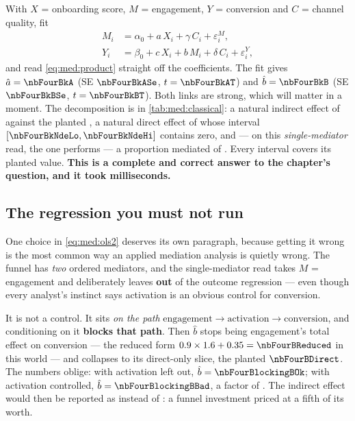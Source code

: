 With $X$ = onboarding score, $M$ = engagement, $Y$ = conversion and $C$ = channel quality, fit
%
\begin{align}
  M_i &= \alpha_0 + a\,X_i + \gamma\,C_i + \varepsilon^M_i, \label{eq:med:ols1}\\
  Y_i &= \beta_0 + c\,X_i + b\,M_i + \delta\,C_i + \varepsilon^Y_i, \label{eq:med:ols2}
\end{align}
%
and read \cref{eq:med:product} straight off the coefficients. The fit gives
$\hat a = \nbFourBkA$ (SE $\nbFourBkASe$, $t = \nbFourBkAT$) and $\hat b = \nbFourBkB$
(SE $\nbFourBkBSe$, $t = \nbFourBkBT$). Both links are strong, which will matter in a moment.
The decomposition is in \cref{tab:med:classical}: a natural indirect effect of \nbFourBkNie{}
against the planted \nbFourTrueTotal, a natural direct effect of \nbFourBkNde{} whose interval
$[\nbFourBkNdeLo, \nbFourBkNdeHi]$ contains zero, and --- on this \emph{single-mediator} read, the
one  performs --- a proportion mediated of \pc{\nbFourBkProp}.
Every interval covers its planted value. \textbf{This is a complete and correct
answer to the chapter's question, and it took milliseconds.}



\subsection*{The regression you must not run}

One choice in \cref{eq:med:ols2} deserves its own paragraph, because getting it wrong is the most
common way an applied mediation analysis is quietly wrong. The funnel has \emph{two} ordered
mediators, and the single-mediator read takes $M$ = engagement and deliberately leaves
 \textbf{out} of the outcome regression --- even though every analyst's instinct
says activation is an obvious control for conversion.

It is not a control. It sits \emph{on the path}
$\text{engagement} \to \text{activation} \to \text{conversion}$, and conditioning on it
\textbf{blocks that path}. Then $\hat b$ stops being engagement's total effect on conversion --- the
reduced form $0.9 \times 1.6 + 0.35 = \nbFourBReduced$ in this world --- and collapses to its
direct-only slice, the planted $\nbFourBDirect$. The numbers oblige: with activation left out,
$\hat b = \nbFourBlockingBOk$; with activation controlled, $\hat b = \nbFourBlockingBBad$, a factor
of \nbFourBlockingFactor. The indirect effect would then be reported as \nbFourBlockingNie{}
instead of \nbFourBkNie: a funnel investment priced at a fifth of its worth.

